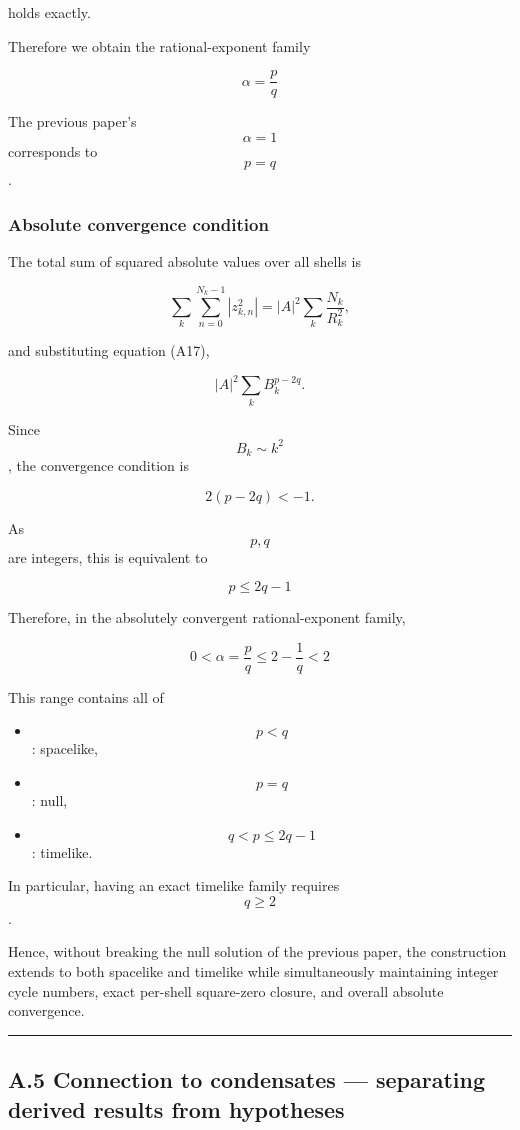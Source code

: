 \documentclass[
  a4paper,
]{article}
\providecommand{\tightlist}{%
  \setlength{\itemsep}{0pt}\setlength{\parskip}{0pt}}
\begin{document}
holds exactly.

Therefore we obtain the rational-exponent family

\[
\boxed{
\alpha=\frac{p}{q}
}
\tag{A21}
\]

The previous paper's \[\alpha=1\] corresponds to \[p=q\].

\subsubsection{Absolute convergence
condition}\label{absolute-convergence-condition}

The total sum of squared absolute values over all shells is

\[
\sum_k\sum_{n=0}^{N_k-1}|z_{k,n}^2|
=
|A|^2
\sum_k
\frac{N_k}{R_k^2},
\]

and substituting equation (A17),

\[
|A|^2
\sum_k
B_k^{p-2q}.
\tag{A22}
\]

Since \[B_k\sim k^2\], the convergence condition is

\[
2(p-2q)<-1.
\]

As \[p,q\] are integers, this is equivalent to

\[
\boxed{
p\le2q-1
}
\tag{A23}
\]

Therefore, in the absolutely convergent rational-exponent family,

\[
\boxed{
0<\alpha
=
\frac pq
\le
2-
\frac1q
<2
}
\tag{A24}
\]

This range contains all of

\begin{itemize}
\tightlist
\item
  \[p<q\]: spacelike,
\item
  \[p=q\]: null,
\item
  \[q<p\le2q-1\]: timelike.
\end{itemize}

In particular, having an exact timelike family requires \[q\ge2\].

Hence, without breaking the null solution of the previous paper, the
construction extends to both spacelike and timelike while simultaneously
maintaining integer cycle numbers, exact per-shell square-zero closure,
and overall absolute convergence.

\begin{center}\rule{0.5\linewidth}{0.5pt}\end{center}

\subsection{A.5 Connection to condensates --- separating derived results
from
hypotheses}\label{a.5-connection-to-condensates-separating-derived-results-from-hypotheses}
\end{document}

